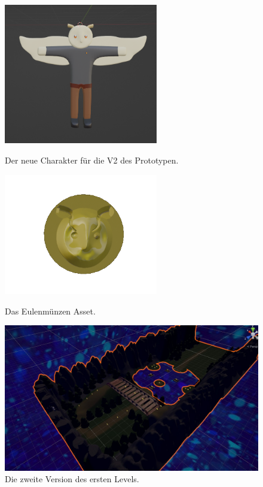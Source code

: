 \begin{figure}[h]
  \centering
  \begin{minipage}[b]{0.45\textwidth}
    \centering
    \includegraphics*[width=0.6\textwidth]{chapters/04/images/V2/char.png}
    \caption{Der neue Charakter für die V2 des Prototypen.}
    \label{fig:PE05}
  \end{minipage}
  \hfill
  \begin{minipage}[b]{0.45\textwidth}
    \centering
    \includegraphics*[width=0.6\textwidth]{chapters/04/images/V2/r4.png}
    \caption{Das Eulenmünzen Asset.}
    \label{fig:PE06}
  \end{minipage}
  \vfil
  \begin{minipage}[b]{1\textwidth}
    \centering
    \includegraphics*[width=1\textwidth]{chapters/04/images/V2/V2.jpg}
    \caption{Die zweite Version des ersten Levels.}
    \label{fig:PE07}
  \end{minipage}
\end{figure}

